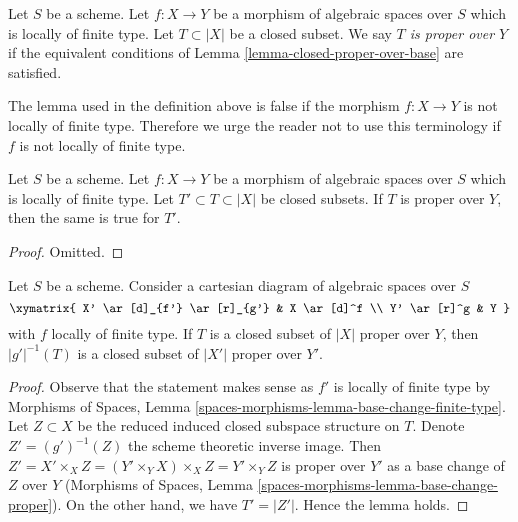 \begin{definition}
\label{definition-proper-over-base}
Let $S$ be a scheme.
Let $f : X \to Y$ be a morphism of algebraic spaces over $S$
which is locally of finite type.
Let $T \subset |X|$ be a closed subset.
We say {\it $T$ is proper over $Y$}
if the equivalent conditions of Lemma \ref{lemma-closed-proper-over-base}
are satisfied.
\end{definition}

\noindent
The lemma used in the definition above is false if the morphism
$f : X \to Y$ is not locally of finite type. Therefore we urge
the reader not to use this terminology if $f$ is not locally of
finite type.

\begin{lemma}
\label{lemma-closed-closed-proper-over-base}
Let $S$ be a scheme.
Let $f : X \to Y$ be a morphism of algebraic spaces over $S$
which is locally of finite type.
Let $T' \subset T \subset |X|$ be closed subsets.
If $T$ is proper over $Y$, then the same is true for $T'$.
\end{lemma}

\begin{proof}
Omitted.
\end{proof}

\begin{lemma}
\label{lemma-base-change-closed-proper-over-base}
Let $S$ be a scheme.
Consider a cartesian diagram of algebraic spaces over $S$
$$
\xymatrix{
X' \ar[d]_{f'} \ar[r]_{g'} & X \ar[d]^f \\
Y' \ar[r]^g & Y
}
$$
with $f$ locally of finite type.
If $T$ is a closed subset of $|X|$ proper over $Y$, then
$|g'|^{-1}(T)$ is a closed subset of $|X'|$ proper over $Y'$.
\end{lemma}

\begin{proof}
Observe that the statement makes sense as $f'$ is locally of
finite type by Morphisms of Spaces, Lemma
\ref{spaces-morphisms-lemma-base-change-finite-type}.
Let $Z \subset X$ be the reduced induced closed subspace structure on $T$.
Denote $Z' = (g')^{-1}(Z)$ the scheme theoretic inverse image.
Then $Z' = X' \times_X Z = (Y' \times_Y X) \times_X Z = Y' \times_Y Z$
is proper over $Y'$ as a base change of $Z$ over $Y$
(Morphisms of Spaces, Lemma \ref{spaces-morphisms-lemma-base-change-proper}).
On the other hand, we have $T' = |Z'|$. Hence the lemma holds.
\end{proof}

